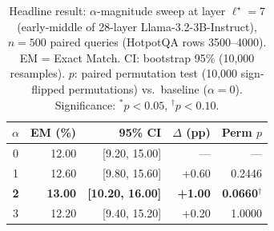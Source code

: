 \begin{table}[htbp]
\caption{Headline result: $\alpha$-magnitude sweep at layer $\ell^\star\!=\!7$ (early-middle of 28-layer Llama-3.2-3B-Instruct), $n\!=\!500$ paired queries (HotpotQA rows 3500--4000). EM = Exact Match. CI: bootstrap 95\% (10{,}000 resamples). $p$: paired permutation test (10{,}000 sign-flipped permutations) vs.\ baseline ($\alpha\!=\!0$). Significance: $^{\ast}p<0.05$, $^{\dagger}p<0.10$.}
\label{tab:layer7-headline}
\centering\renewcommand{\arraystretch}{1.15}
\begin{tabular}{c r r r r}
\toprule
$\alpha$ & EM (\%) & 95\% CI & $\Delta$ (pp) & Perm $p$ \\
\midrule
0 & 12.00 & [9.20, 15.00] & --- & --- \\
1 & 12.60 & [9.80, 15.60] & +0.60 & 0.2446 \\
\textbf{2} & \textbf{13.00} & \textbf{[10.20, 16.00]} & \textbf{+1.00} & \textbf{0.0660$^{\dagger}$} \\
3 & 12.20 & [9.40, 15.20] & +0.20 & 1.0000 \\
\bottomrule\end{tabular}\end{table}
